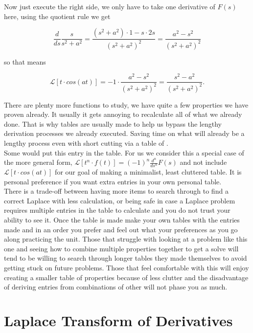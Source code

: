 \documentclass[12pt]{article}
\newcommand{\lp}{\mathscr{L}}
\begin{document}
Now just execute the right side, we only have to take one derivative of $F(s)$ here, using the quotient rule we get

\begin{equation*}
    \frac{d}{ds}\frac{s}{s^2+a^2}= \frac{(s^2+a^2)\cdot1-s\cdot2s}{(s^2+a^2)^2} = \frac{a^2-s^2}{(s^2+a^2)^2}
\end{equation*}

so that means

\begin{equation*}
    \lp[t \cdot cos(at)]=-1\cdot\frac{a^2-s^2}{(s^2+a^2)^2}=\frac{s^2-a^2}{(s^2+a^2)^2}.
\end{equation*}

There are plenty more functions to study, we have quite a few properties we have proven already. It usually it gets annoying to recalculate all of what we already done. That is why tables are usually made to help us bypass the lengthy derivation processes we already executed. Saving time on what will already be a lengthy process even with short cutting via a table of . \\

Some would put this entry in the table. For us we consider this a special case of the more general form, $\lp[t^n \cdot f(t)]=(-1)^n \frac{d^n}{ds^n}F(s)$ and not include $\lp[t \cdot cos(at)]$ for our goal of making a minimalist, least cluttered table. It is personal preference if you want extra entries in your own personal table. \\

There is a trade-off between having more items to search through to find a correct Laplace with less calculation, or being safe in case a Laplace problem requires multiple entries in the table to calculate and you do not trust your ability to see it. Once the table is made make your own tables with the entries made and in an order you prefer and feel out what your preferences as you go along practicing the unit. Those that struggle with looking at a problem like this one and seeing how to combine multiple properties together to get a solve will tend to be willing to search through longer tables they made themselves to avoid getting stuck on future problems. Those that feel comfortable with this will enjoy creating a smaller table of properties because of less clutter and the disadvantage of deriving entries from combinations of other will not phase you as much.

\section{Laplace Transform of Derivatives}
\end{document}
